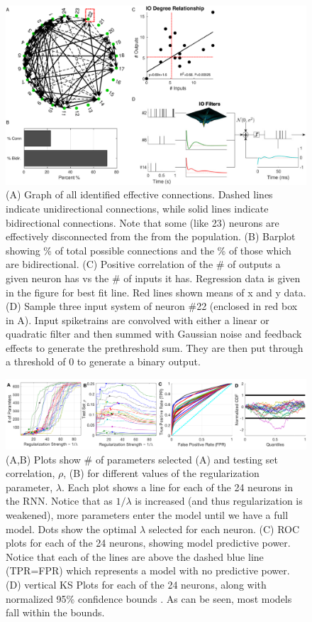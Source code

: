 \documentclass[journal,twoside,web]{ieeecolor}
\newcommand{\nn}{24}    %
\begin{document}
\begin{figure}[!ht]
	\centering
	\includegraphics[width=160mm]{graph}
	\caption[Graph \& Example System]{
		(A) Graph of all identified effective connections. Dashed lines indicate unidirectional connections, while solid lines indicate bidirectional connections. Note that some (like 23) neurons are effectively disconnected from the from the population.
		(B) Barplot showing \% of total possible connections and the \% of those which are bidirectional.
		(C) Positive correlation of the \# of outputs a given neuron has vs the \# of inputs it has. Regression data is given in the figure for best fit line. Red lines shown means of x and y data.
		(D) Sample three input system of neuron \#22 (enclosed in red box in A). Input spiketrains are convolved with either a linear or quadratic filter and then summed with Gaussian noise and feedback effects to generate the prethreshold sum. They are then put through a threshold of 0 to generate a binary output.}
	\label{graph}
\end{figure}

\begin{figure}[!ht]
	\centering
	\includegraphics[width=170mm]{regpath}
	\caption[Regularization Path]{
		(A,B) Plots show \# of parameters selected (A) and testing set correlation, $\rho$, (B) for different values of the regularization parameter, $\lambda$. Each plot shows a line for each of the \nn{} neurons in the RNN. Notice that as $1/\lambda$ is increased (and thus regularization is weakened), more parameters enter the model until we have a full model. Dots show the optimal $\lambda$ selected for each neuron.
		(C) ROC plots for each of the \nn{} neurons, showing model predictive power. Notice that each of the lines are above the dashed blue line (TPR=FPR) which represents a model with no predictive power.
		(D) vertical KS Plots for each of the \nn{} neurons, along with normalized 95\% confidence bounds \cite{song13sparse}. As can be seen, most models fall within the bounds.}
	\label{regpath}
\end{figure}
\end{document}
